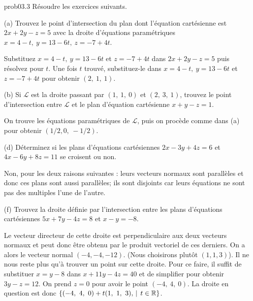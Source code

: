 \bigskip
\begin{sol}{prob03.3}  Résoudre les exercices suivants. 

\medskip
(a) Trouvez le point d'intersection du plan dont l'équation cartésienne est $2x+2y-z=5$ 
avec la droite d'équations paramétriques $x=4-t,\ y=13-6t,\ z=-7+4t$.  \medskip

\soln Substituez $x=4-t,\ y=13-6t$ et $ z=-7+4t$ dans $2x+2y-z=5$ puis résolvez pour $t$. Une fois $t$ trouv\'e, substituez-le dans $x=4-t,\ y=13-6t$ et $ z=-7+4t$ pour obtenir $(2,\ 1,\ 1)$.\medskip

\medskip

(b) Si $\mathcal L$ est la droite passant par $(1,\ 1,\ 0)$ et $(2,\
3,\ 1)$, trouvez le point d'intersection entre $\mathcal L$ et le plan d'équation cartésienne $x+y-z=1$. 

\soln On trouve les équations paramétriques de $\mathcal L$, puis on procède comme dans (a) pour obtenir $(1/2,0,\ -1/2)$.


\medskip\medskip

(d) D\'eterminez si les plans d'équations cartésiennes $2x-3y+4z=6$ et $4x-
6y+8z=11$ se croisent ou non.

\soln Non, pour les deux raisons suivantes : leurs vecteurs normaux sont parallèles et donc ces plans sont aussi parallèles; ils sont disjoints car leurs équations ne sont pas des multiples l'une de l'autre.

\medskip\medskip


(f) Trouvez la droite définie par l'intersection entre les plans d'équations cartésiennes $5x+7y-4z=8$ et $x-y=-8$.

\soln Le vecteur directeur de cette droite est perpendiculaire aux deux vecteurs normaux et peut donc être obtenu par le produit vectoriel de ces derniers. On a  alors le vecteur normal $(-4, -4, -12)$. (Nous choisirons plutôt $(1,1,3)$). Il ne nous reste plus qu'à trouver un point sur cette droite. Pour ce faire, il suffit de substituer $x= y-8$ dans $x+11y-4z=40$ et de simplifier pour obtenir $3y-z=12$. On prend $z=0$ pour avoir le point $(-4,\ 4,\ 0)$. La droite en question est donc $\set{(-4,\ 4,\ 0)+ t (1,\ 1,\ 3),\st t\in \R}$.\medskip

 

\end{sol} 

